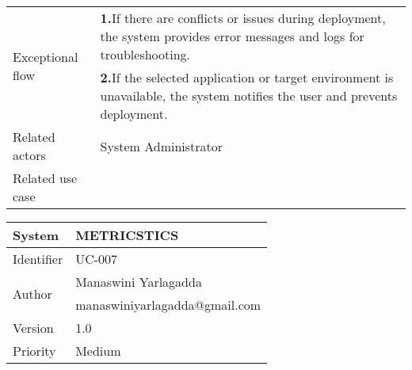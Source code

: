 \begin{table}[htb]
\begin{tabular}{|p{4cm}|p{12cm}|}
        
        \hline
         \multirow{2}{*}{Exceptional flow} 
        & \textbf{1.}If there are conflicts or issues during deployment, the system provides error messages and logs for troubleshooting. \\ 
        & \textbf{2.}If the selected application or target environment is unavailable, the system notifies the user and prevents deployment.\\ \hline 
        Related actors & System Administrator \\ \hline
        Related use case &  \\ \hline
    \end{tabular}
    \caption{}
    \label{tab:my_label}
\end{table}
\begin{table}[htb]
    \centering
    \begin{tabular}{|p{4cm}|p{12cm}|} \hline 
         System &  METRICSTICS\\ \hline 
         
         Identifier & UC-007 \\ \hline 
         
         \multirow{2}{*}{Author} & Manaswini Yarlagadda   \\
         &manaswiniyarlagadda@gmail.com \\
           \hline 
           Version & 1.0\\ \hline
         
         Priority &  Medium\\ \hline 
         

\end{tabular}
\end{table}
